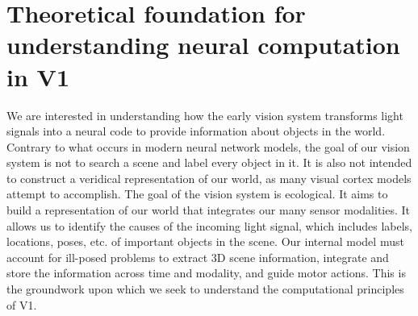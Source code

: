 %
%
%
%
%
%
%
%


\section{Theoretical foundation for understanding neural computation in V1}\label{sec:ch1_theory}
We are interested in understanding how the early vision system transforms light signals into a neural code to provide information about objects in the world.
Contrary to what occurs in modern neural network models, the goal of our vision system is not to search a scene and label every object in it. It is also not intended to construct a veridical representation of our world, as many visual cortex models attempt to accomplish. The goal of the vision system is ecological. It aims to build a representation of our world that integrates our many sensor modalities. It allows us to identify the causes of the incoming light signal, which includes labels, locations, poses, etc. of important objects in the scene. Our internal model must account for ill-posed problems to extract 3D scene information, integrate and store the information across time and modality, and guide motor actions. This is the groundwork upon which we seek to understand the computational principles of V1.

